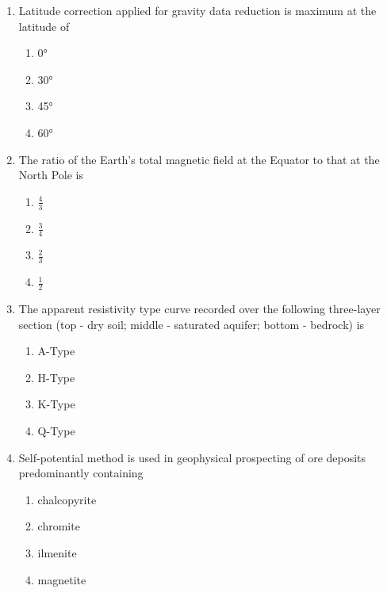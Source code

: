 \documentclass[journal,12pt,onecolumn]{IEEEtran}
\theoremstyle{remark}
\begin{document}
\begin{enumerate}[resume]

\item Latitude correction applied for gravity data reduction is maximum at the latitude of
\begin{multicols}{4}
\begin{enumerate}
\item 0°
\item 30°
\item 45°
\item 60°
\end{enumerate}
\end{multicols}
\vspace{0.5cm}

\item The ratio of the Earth's total magnetic field at the Equator to that at the North Pole is
\begin{multicols}{4}
\begin{enumerate}
\item $\frac{4}{3}$
\item $\frac{3}{4}$
\item $\frac{2}{3}$
\item $\frac{1}{2}$
\end{enumerate}
\end{multicols}
\vspace{0.5cm}

\item The apparent resistivity type curve recorded over the following three-layer section (top - dry soil; middle - saturated aquifer; bottom - bedrock) is
\begin{multicols}{4}
\begin{enumerate}
\item A-Type
\item H-Type
\item K-Type
\item Q-Type
\end{enumerate}
\end{multicols}
\vspace{0.5cm}

\item Self-potential method is used in geophysical prospecting of ore deposits predominantly containing
\begin{multicols}{4}
\begin{enumerate}
\item chalcopyrite
\item chromite
\item ilmenite
\item magnetite
\end{enumerate}
\end{multicols}
\vspace{0.5cm}


\end{enumerate}
\end{document}
